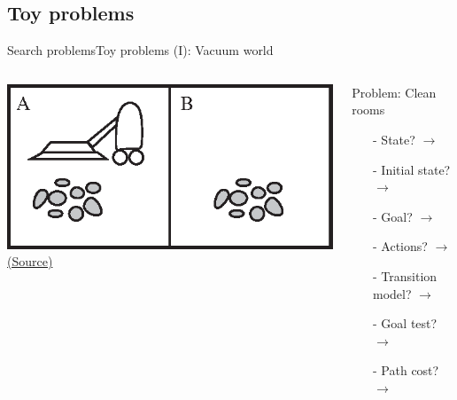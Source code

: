 \documentclass[10pt,compress]{beamer} %
\begin{document}
\subsection{Toy problems}
\begin{frame}[fragile]{Search problems}{Toy problems (I): Vacuum world}
       \begin{columns}
	            \centering 
                 \includegraphics[width=\linewidth]{figs/vacuum2-environment.eps}\\
	            \tiny{\href{http://aima.cs.berkeley.edu/index.html}{(Source)}}

                \begin{exampleblock}{Problem: Clean rooms}
                    \begin{itemize}
                    \item[-] State? $\rightarrow$ 
                    \item[-] Initial state? $\rightarrow$ 
                    \item[-] Goal? $\rightarrow$ 
                    \item[-] Actions? $\rightarrow$ 
                    \item[-] Transition model? $\rightarrow$ 
                    \item[-] Goal test? $\rightarrow$ 
                    \item[-] Path cost? $\rightarrow$
                    \end{itemize}
                \end{exampleblock}
      \end{columns}
\end{frame}
\end{document}
